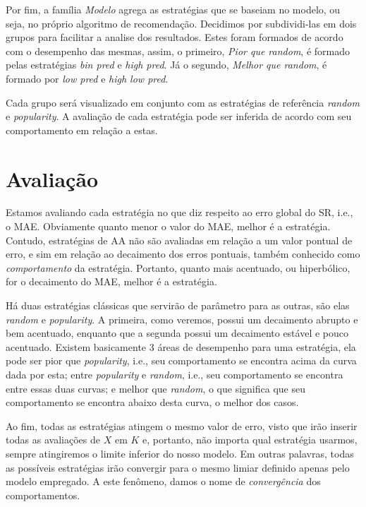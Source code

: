 Por fim, a família \textit{Modelo} agrega as estratégias que se baseiam no modelo, ou seja, no próprio algoritmo de recomendação. Decidimos por subdividi-las em dois grupos para facilitar a analise dos resultados. Estes foram formados de acordo com o desempenho das mesmas, assim, o primeiro, \textit{Pior que random}, é formado pelas estratégias \textit{bin pred} e \textit{high pred}. Já o segundo, \textit{Melhor que random}, é formado por \textit{low pred} e \textit{high low pred}.

Cada grupo será visualizado em conjunto com as estratégias de referência \textit{random} e \textit{popularity}. A avaliação de cada estratégia pode ser inferida de acordo com seu comportamento em relação a estas.

\section{Avaliação} 

Estamos avaliando cada estratégia no que diz respeito ao erro global do SR, i.e., o MAE. Obviamente quanto menor o valor do MAE, melhor é a estratégia. Contudo, estratégias de AA não são avaliadas em relação a um valor pontual de erro, e sim em relação ao decaimento dos erros pontuais, também conhecido como \textit{comportamento} da estratégia. Portanto, quanto mais acentuado, ou hiperbólico, for o decaimento do MAE, melhor é a estratégia.

Há duas estratégias clássicas que servirão de parâmetro para as outras, são elas \textit{random} e \textit{popularity}. A primeira, como veremos, possui um decaimento abrupto e bem acentuado, enquanto que a segunda possui um decaimento estável e pouco acentuado. Existem basicamente 3 áreas de desempenho para uma estratégia, ela pode ser pior que \textit{popularity}, i.e., seu comportamento se encontra acima da curva dada por esta; entre \textit{popularity} e \textit{random}, i.e., seu comportamento se encontra entre essas duas curvas; e melhor que \textit{random}, o que significa que seu comportamento se encontra abaixo desta curva, o melhor dos casos.

Ao fim, todas as estratégias atingem o mesmo valor de erro, visto que irão inserir todas as avaliações de $X$ em $K$ e, portanto, não importa qual estratégia usarmos, sempre atingiremos o limite inferior do nosso modelo. Em outras palavras, todas as possíveis estratégias irão convergir para o mesmo limiar definido apenas pelo modelo empregado. A este fenômeno, damos o nome de \textit{convergência} dos comportamentos.   


